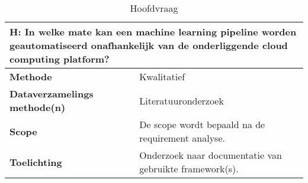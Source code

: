 \space
\newpage

\begin{table}[hbt!]
\centering
\begin{tabular}{|p{.215\linewidth}|p{.72\linewidth}|}
\hline
\multicolumn{2}{|p{.97\linewidth}|}{\textbf{H: In welke mate kan een machine learning pipeline worden geautomatiseerd onafhankelijk van de onderliggende cloud computing platform?}} \\ \hline
  \textbf{Methode}&
    Kwalitatief
  \\ \hline
  \textbf{Dataverzamelings methode(n)}&
    Literatuuronderzoek
  \\ \hline
  \textbf{Scope}&
    De scope wordt bepaald na de requirement analyse.
  \\ \hline
  \textbf{Toelichting}&
    Onderzoek naar documentatie van gebruikte framework(s).
  \\ \hline
\end{tabular}
\caption{Hoofdvraag}
\label{table:mq}
\end{table}